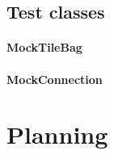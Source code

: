 \documentclass[12pt, letterpaper]{article}
\begin{document}


    \subsection{Test classes}
    \label{subsec:testClasses}

    \paragraph{MockTileBag}

    \paragraph{MockConnection}


    \section{Planning}

\end{document}

